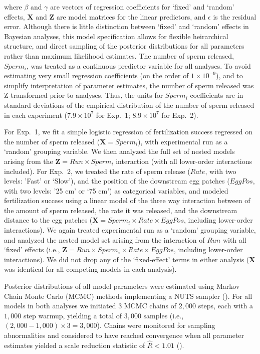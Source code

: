 \documentclass{article}
\begin{document}
	\noindent where $\beta$ and $\gamma$ are vectors of regression coefficients for `fixed' and `random' effects, $\mathbf{X}$ and $\mathbf{Z}$ are model matrices for the linear predictors, and $\epsilon$ is the residual error. Although there is little distinction between `fixed' and `random' effects in Bayesian analyses, this model specification allows for flexible heirarchical structure, and direct sampling of the posterior distributions for all parameters rather than maximum likelihood estimates. The number of sperm released, $Sperm_i$, was treated as a continuous predictor variable for all analyses. To avoid estimating very small regression coefficients (on the order of $1 \times 10^{-9}$), and to simplify interpretation of parameter estimates, the number of sperm released was Z-transformed prior to analyses. Thus, the units for $Sperm_i$ coefficients are in standard deviations of the empirical distribution of the number of sperm released in each experiment ($7.9 \times 10^{7}$ for Exp.~1; $8.9 \times 10^{7}$ for Exp.~2). 

	For Exp.~1, we fit a simple logistic regression of fertilization success regressed on the number of sperm released ($\mathbf{X} = Sperm_i$), with experimental run as a `random' grouping variable. We then analyzed the full set of nested models arising from the $\mathbf{Z} = Run \times Sperm_i$ interaction (with all lower-order interactions included). For Exp.~2, we treated the rate of sperm release ($Rate$, with two levels: 'Fast' or `Slow'), and the position of the downstream egg patches ($EggPos$, with two levels: '25 cm' or `75 cm') as categorical variables, and modeled fertilization success using a linear model of the three way interaction between of the amount of sperm released, the rate it was released, and the downstream distance to the egg patches ($ \mathbf{X} = Sperm_i \times Rate \times EggPos$, including lower-order interactions). We again treated experimental run as a `random' grouping variable, and analyzed the nested model set arising from the interaction of $Run$ with all `fixed' effects (i.e., $\mathbf{Z} = Run \times Sperm_i \times Rate \times EggPos$, including lower-order interactions). We did not drop any of the `fixed-effect' terms in either analysis ($\mathbf{X}$ was identical for all competing models in each analysis).

	Posterior distributions of all model parameters were estimated using Markov Chain Monte Carlo (MCMC) methods implementing a NUTS sampler (\citealt{Stan2016}). For all models in both analyses we initiated $3$ MCMC chains of $2,000$ steps, each with a $1,000$ step warmup, yielding a total of $3,000$ samples (i.e., $(2,000 - 1,000) \times 3 = 3,000$). Chains were monitored for sampling abnormalities and considered to have reached convergence when all parameter estimates yielded a scale reduction statistic of $\hat{R} < 1.01$ (\citealt{GelmanRubin1992}).
\end{document}

